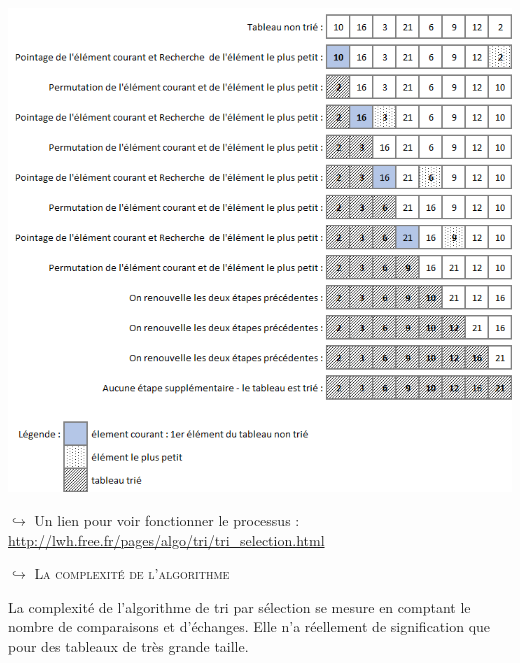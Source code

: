 \documentclass[a4paper,french]{article}
\begin{document}
\includegraphics[scale=0.5]{Triparselection.png}
\bigskip

$\hookrightarrow$ Un lien pour voir fonctionner le processus : 
\url{http://lwh.free.fr/pages/algo/tri/tri_selection.html}
\bigskip

$\hookrightarrow$ \textsc{La complexité de l'algorithme}
\medskip


La complexité de l'algorithme de tri par sélection se mesure en comptant le nombre de comparaisons et d'échanges. Elle n'a réellement de signification que pour des tableaux de très grande taille.
\end{document}
